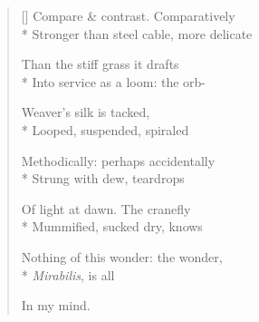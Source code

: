 \begin{verse}[\versewidth]
Compare \& contrast. \qquad Comparatively\\*
Stronger than steel cable, more delicate

Than the stiff grass it drafts\\*
Into service as a loom: the orb-

Weaver's silk is tacked,\\*
Looped, suspended, spiraled

Methodically: perhaps accidentally\\*
Strung with dew, teardrops 

Of light at dawn.  The cranefly\\*
Mummified, sucked dry, knows

Nothing of this wonder: the wonder,\\*
\textit{Mirabilis}, is all 

In my mind.
\end{verse}
